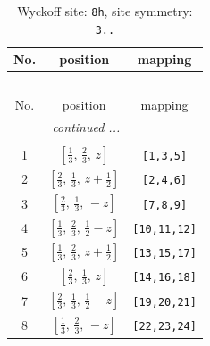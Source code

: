 \documentclass[fleqn,8pt]{jsarticle}
\begin{document}
\begin{longtable}{ccc}
\caption{Wyckoff site: {\tt 8h}, site symmetry: {\tt 3..}}
 \\
 \hline \hline
No. & position & mapping \\ \hline \endfirsthead

\multicolumn{2}{l}{\tablename\ \thetable{}} \\
 \hline \hline
No. & position & mapping \\ \hline \endhead

 \hline \hline
\multicolumn{2}{r}{\footnotesize\it continued ...} \\ \endfoot

 \hline \hline
\multicolumn{2}{r}{} \\ \endlastfoot

1 & $\left[ \frac{1}{3},\, \frac{2}{3},\, z \right]$ & {\tt [1,3,5]} \\ \hline
2 & $\left[ \frac{2}{3},\, \frac{1}{3},\, z + \frac{1}{2} \right]$ & {\tt [2,4,6]} \\ \hline
3 & $\left[ \frac{2}{3},\, \frac{1}{3},\, - z \right]$ & {\tt [7,8,9]} \\ \hline
4 & $\left[ \frac{1}{3},\, \frac{2}{3},\, \frac{1}{2} - z \right]$ & {\tt [10,11,12]} \\ \hline
5 & $\left[ \frac{1}{3},\, \frac{2}{3},\, z + \frac{1}{2} \right]$ & {\tt [13,15,17]} \\ \hline
6 & $\left[ \frac{2}{3},\, \frac{1}{3},\, z \right]$ & {\tt [14,16,18]} \\ \hline
7 & $\left[ \frac{2}{3},\, \frac{1}{3},\, \frac{1}{2} - z \right]$ & {\tt [19,20,21]} \\ \hline
8 & $\left[ \frac{1}{3},\, \frac{2}{3},\, - z \right]$ & {\tt [22,23,24]} \\
\end{longtable}
\renewcommand{\arraystretch}{1.2}
\end{document}
